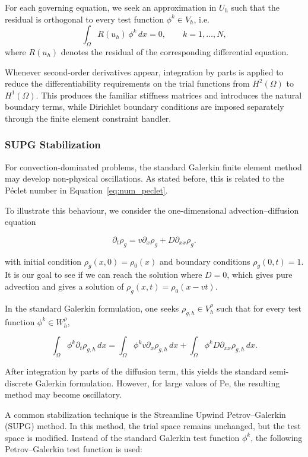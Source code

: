 For each governing equation, we seek an approximation in $U_h$ such that the residual is orthogonal to every test function $\phi^k\in V_h$, i.e.
\[
\int_\Omega R(u_h)\,\phi^k\,dx = 0,
\qquad
k=1,\ldots,N,
\]
where $R(u_h)$ denotes the residual of the corresponding differential equation.

Whenever second-order derivatives appear, integration by parts is applied to reduce the differentiability requirements on the trial functions from
$H^2(\Omega)$ to $H^1(\Omega)$. This produces the familiar stiffness matrices and introduces the natural boundary terms, while Dirichlet boundary conditions are imposed separately through the finite element constraint handler.

\subsubsection{SUPG Stabilization}

For convection-dominated problems, the standard Galerkin finite element method may develop non-physical oscillations. As stated before, this is related to the P\'eclet number in Equation~\ref{eq:num_peclet}.

To illustrate this behaviour, we consider the one-dimensional advection--diffusion equation

\begin{equation}
    \partial_t \rho_g = v \partial_x \rho_g + D \partial_{xx}\rho_g.
\end{equation}

with initial condition $\rho_g(x,0)=\rho_0(x)$ and boundary conditions $\rho_g(0,t)=1$. It is our goal to see if we can reach the solution where $D=0$, which gives pure advection and gives a solution of $\rho_g(x,t)=\rho_0(x-vt)$.

In the standard Galerkin formulation, one seeks \(\rho_{g,h} \in V_h^\rho\) such that for every test function \(\phi^k \in W_h^\rho\),

\begin{equation}
    \int_\Omega \phi^k \partial_t \rho_{g,h}\,dx
    =
    \int_\Omega \phi^k v \partial_x \rho_{g,h}\,dx
    +
    \int_\Omega \phi^k D \partial_{xx}\rho_{g,h}\,dx.
\end{equation}

After integration by parts of the diffusion term, this yields the standard semi-discrete Galerkin formulation. However, for large values of \(\mathrm{Pe}\), the resulting method may become oscillatory.

A common stabilization technique is the Streamline Upwind Petrov--Galerkin (SUPG) method. In this method, the trial space remains unchanged, but the test space is modified. Instead of the standard Galerkin test function \(\phi^k\), the following Petrov--Galerkin test function is used:

